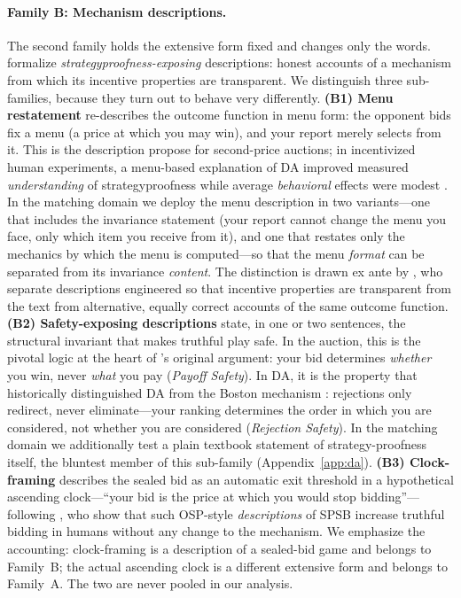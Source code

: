 \paragraph{Family B: Mechanism descriptions.}
The second family holds the extensive form fixed and changes only the words.
\citet{gonczarowski2023strategyproofness} formalize
\emph{strategyproofness-exposing} descriptions: honest accounts of a mechanism
from which its incentive properties are transparent. We distinguish three
sub-families, because they turn out to behave very differently.
\textbf{(B1) Menu restatement} re-describes the outcome function in menu form:
the opponent bids fix a menu (a price at which you may win), and your report
merely selects from it. This is the description
\citet{gonczarowski2023strategyproofness} propose for second-price auctions; in
incentivized human experiments, a menu-based explanation of DA improved
measured \emph{understanding} of strategyproofness while average
\emph{behavioral} effects were modest \citep{gonczarowski2024describing}.
In the matching domain we deploy the menu description in two variants---one
that includes the invariance statement (your report cannot change the menu you
face, only which item you receive from it), and one that restates only the
mechanics by which the menu is computed---so that the menu \emph{format} can
be separated from its invariance \emph{content}. The distinction is drawn ex
ante by \citet{gonczarowski2023strategyproofness}, who separate descriptions
engineered so that incentive properties are transparent from the text from
alternative, equally correct accounts of the same outcome function.
\textbf{(B2) Safety-exposing descriptions} state, in one or two sentences, the
structural invariant that makes truthful play safe. In the auction, this is the
pivotal logic at the heart of \citet{vickrey1961counterspeculation}'s original
argument: your bid determines \emph{whether} you win, never \emph{what} you pay
(\emph{Payoff Safety}). In DA, it is the property that historically
distinguished DA from the Boston mechanism
\citep{abdulkadirouglu2003school}: rejections only redirect, never
eliminate---your ranking determines the order in which you are considered, not
whether you are considered (\emph{Rejection Safety}). In the matching domain
we additionally test a plain textbook statement of strategy-proofness itself,
the bluntest member of this sub-family (Appendix~\ref{app:da}). \textbf{(B3)
Clock-framing} describes the sealed bid as an automatic exit threshold in a
hypothetical ascending clock---``your bid is the price at which you would stop
bidding''---following \citet{breitmoser2022obviousness}, who show that such
OSP-style \emph{descriptions} of SPSB increase truthful bidding in humans
without any change to the mechanism. We emphasize the accounting: clock-framing
is a description of a sealed-bid game and belongs to Family~B; the actual
ascending clock is a different extensive form and belongs to Family~A. The two
are never pooled in our analysis.

